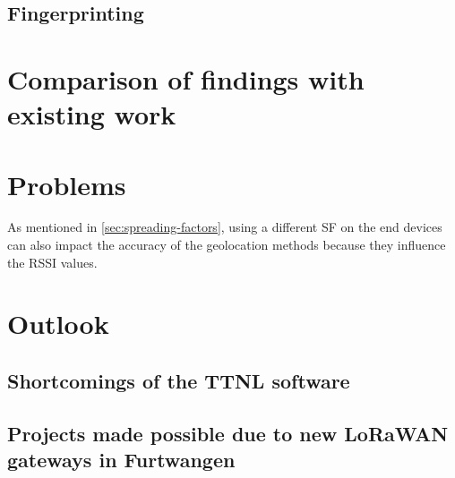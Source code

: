 \subsection{Fingerprinting}



\section{Comparison of findings with existing work}


\section{Problems}


As mentioned in \cref{sec:spreading-factors}, using a different \ac{SF} on the end devices can also impact the accuracy of the geolocation methods because they influence the \ac{RSSI} values.

\section{Outlook}


\subsection{Shortcomings of the \acf{TTNL} software}


\subsection{Projects made possible due to new \acs{LoRaWAN} gateways in Furtwangen}


